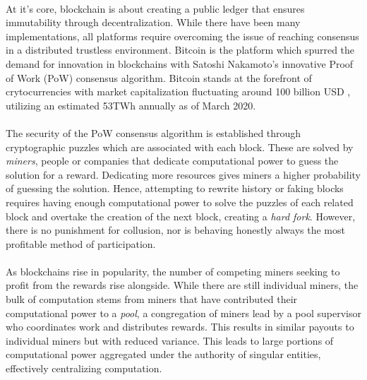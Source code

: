 \paragraph{} At it's core, blockchain is about creating a public ledger that ensures immutability through decentralization. While there have been many implementations, all platforms require overcoming the issue of reaching consensus in a distributed trustless environment. Bitcoin \cite{nakamoto2009} is the platform which spurred the demand for innovation in blockchains with Satoshi Nakamoto's innovative Proof of Work (PoW) consensus algorithm. Bitcoin stands at the forefront of crytocurrencies with market capitalization fluctuating around 100 billion USD \cite{bitcoinmarketcap2020}, utilizing an estimated 53TWh annually \cite{cambridge2020} as of March 2020.


\paragraph{} The security of the PoW consensus algorithm is established through cryptographic puzzles which are associated with each block. These are solved by \textit{miners}, people or companies that dedicate computational power to guess the solution for a reward. Dedicating more resources gives miners a higher probability of guessing the solution. Hence, attempting to rewrite history or faking blocks requires having enough computational power to solve the puzzles of each related block and overtake the creation of the next block, creating a \textit{hard fork}. However, there is no punishment for collusion, nor is behaving honestly always the most profitable method of participation. 

\paragraph{} As blockchains rise in popularity, the number of competing miners seeking to profit from the rewards rise alongside. While there are still individual miners, the bulk of computation stems from miners that have contributed their computational power to a \textit{pool}, a congregation of miners lead by a pool supervisor who coordinates work and distributes rewards. This results in similar payouts to individual miners but with reduced variance. This leads to large portions of computational power aggregated under the authority of singular entities, effectively centralizing computation.

